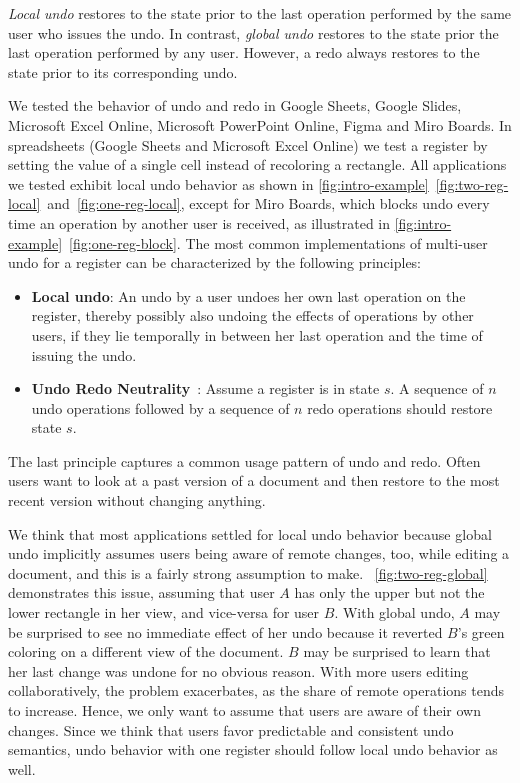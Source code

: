 \documentclass[sigplan,natbib=false,review]{acmart}
\begin{document}
\emph{Local undo} restores to the state prior to the last operation
performed by the same user who issues the undo.
In contrast, \emph{global undo} restores to the state prior the
last operation performed by any user.
However, a redo always restores to the state prior to its corresponding undo.


We tested the behavior of undo and redo in Google Sheets, Google Slides,
Microsoft Excel Online, Microsoft PowerPoint Online, Figma and Miro Boards.
In spreadsheets (Google Sheets and Microsoft Excel Online)
we test a register by setting the value of a single cell instead of recoloring
a rectangle.
All applications we tested exhibit local undo behavior as shown in
\cref{fig:intro-example}~\ref{fig:two-reg-local}~and~\ref{fig:one-reg-local},
except for Miro Boards, which blocks undo every time an operation
by another user is received, as illustrated
in \cref{fig:intro-example}~\ref{fig:one-reg-block}.
The most common implementations of multi-user undo for a register
can be characterized by the following principles:

\begin{itemize}
  \item \textbf{Local undo}:
    An undo by a user undoes her own last operation on the register,
    thereby possibly also undoing the effects of operations
    by other users,
    if they lie temporally in between her last operation and the time of
    issuing the undo.
  \item \textbf{Undo Redo Neutrality}~\cite{figma2019multiplayer}:
    Assume a register is in state $s$.
    A sequence of $n$ undo operations followed by a sequence of $n$ redo operations
    should restore state $s$.
\end{itemize}

The last principle captures a common usage pattern of undo and redo.
Often users want to look at a past version of a document and then restore
to the most recent version without changing anything.


We think that most applications settled for local undo behavior because
global undo implicitly assumes users being aware of remote changes, too,
while editing a document, and this is a fairly strong assumption to make.
~\ref{fig:two-reg-global} demonstrates this issue,
assuming that user $A$ has only the upper but not the lower rectangle in her view,
and vice-versa for user $B$.
With global undo, $A$ may be surprised to see no immediate effect of her undo
because it reverted $B$'s green coloring on a different view of the document.
$B$ may be surprised to learn that her last change was undone for no obvious reason.
With more users editing collaboratively, the problem exacerbates, as the
share of remote operations tends to increase.
Hence, we only want to assume that users are aware of their own changes.
Since we think that users favor predictable and consistent undo semantics,
undo behavior with one register should follow local undo behavior as well.
\end{document}
